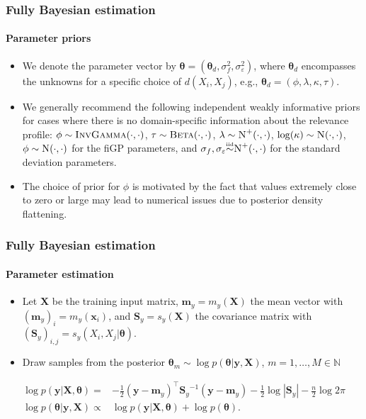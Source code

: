 \documentclass{snedecorbeamer}
\begin{document}
\begin{frame}%
  \label{frm:bayesian-priors}
  \frametitle{Fully Bayesian estimation}
  \framesubtitle{Parameter priors}

  \begin{itemize}
  \item We denote the parameter vector by $\bm{\theta} =
    (\bm{\theta}_{d}, \sigma_f^2, \sigma_{\varepsilon}^2)$, where
    $\bm{\theta}_{d}$ encompasses the unknowns for a specific choice of
    $d(X_i, X_j)$, e.g., $\bm{\theta}_{d} = (\phi, \lambda, \kappa, \tau)$.
  \item We generally recommend the following independent weakly informative
    priors for cases where there is no domain-specific information about
    the relevance profile:
    $\phi \sim \textsc{InvGamma}(\cdot, \cdot)$,
    $\tau \sim \textsc{Beta}(\cdot, \cdot)$,
    $\lambda \sim \textsc{N}^{+}(\cdot, \cdot)$,
    $\log(\kappa) \sim \textsc{N}(\cdot, \cdot)$,
    $\phi\sim\textsc{N}(\cdot, \cdot)$
    for the fiGP parameters, and
    $\sigma_f, \sigma_{\varepsilon} \smash{\overset{\text{\tiny iid}}{\sim}} \textsc{N}^{+}(\cdot, \cdot)$
    for the standard deviation parameters.
  \item The choice
    of prior for $\phi$ is motivated by the fact that values extremely
    close to zero or large may lead to numerical issues due to posterior
    density flattening.
  \end{itemize}
\end{frame}

\begin{frame}%
  \label{frm:bayesian-estimation}
  \frametitle{Fully Bayesian estimation}
  \framesubtitle{Parameter estimation}

  \begin{itemize}
  \item Let $\mathbf{X}$ be the training input matrix, $\mathbf{m}_y =
    m_y(\mathbf{X})$ the mean vector with %
    ${(\mathbf{m}_y)}_{i} = m_y(\mathbf{x}_i)$, and $\mathbf{S}_y =
    s_y(\mathbf{X})$ the covariance matrix with %
    ${(\mathbf{S}_y)}_{i, j} = s_y(X_i, X_j | {\bm{\theta}})$.
  \item Draw samples from the posterior $\bm{\theta}_m\sim\log p(\bm{\theta} |
    \mathbf{y}, \mathbf{X})$, $m = 1, \dots, M\in\mathbb{N}$
  \end{itemize}
  \begin{align}
    \label{eq:margina-likelihood}
    \log p(\mathbf{y} | \mathbf{X}, \bm{\theta})
    =& -\frac{1}{2}
       {(\mathbf{y} - \mathbf{m}_y)}^\top
       {\mathbf{S}_y}^{-1}
       {(\mathbf{y} - \mathbf{m}_y)}
       -\frac{1}{2}
       \log | \mathbf{S}_y |
       - \frac{n}{2} \log 2\pi \\
    \label{eq:parameter-posterior}
    \log p(\bm{\theta} | \mathbf{y}, \mathbf{X})
    \propto&
             \log p(\mathbf{y} | \mathbf{X}, \bm{\theta}) +
             \log p(\bm{\theta}).
  \end{align}

\end{frame}
\end{document}

